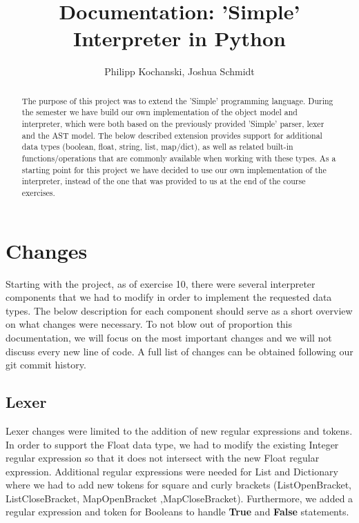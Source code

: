 \documentclass{article}
\begin{document}
\title{Documentation: 'Simple' Interpreter in Python}
\author{Philipp Kochanski, Joshua Schmidt}

\maketitle

\begin{abstract}
The purpose of this project was to extend the 'Simple' programming language.
During the semester we have build our own implementation of the object model and interpreter, which were both based
on the previously provided 'Simple' parser, lexer and the AST model. The below described extension provides support for additional data types (boolean, float, string, list, map/dict), as well as related built-in functions/operations that are commonly available when working with these types. As a starting point for this project we have decided to use our own implementation of the interpreter, instead of the one that was provided to us at the end of the course exercises. 
\end{abstract}

\section{Changes}
Starting with the project, as of exercise 10, there were several interpreter components that we had to modify in order to implement the requested data types. The below description for each component should serve as a short overview on what changes were necessary. To not blow out of proportion this documentation, we will focus on the most important changes and we will not discuss every new line of code. A full list of changes can be obtained following our git commit history.

\subsection{Lexer}
Lexer changes were limited to the addition of new regular expressions and tokens. In order to support the Float data type, we had to modify the existing Integer regular expression so that it does not intersect with the new Float regular expression. Additional regular expressions were needed for List and Dictionary where we had to add new tokens for square and curly brackets (ListOpenBracket, ListCloseBracket, MapOpenBracket ,MapCloseBracket). Furthermore, we added a regular expression and token for Booleans to handle \textbf{True} and \textbf{False} statements.
\end{document}
